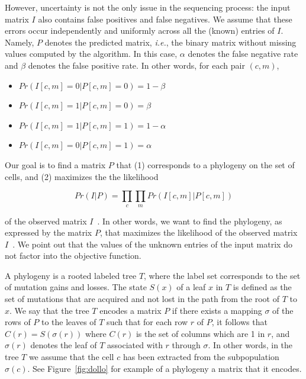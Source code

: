 \documentclass[a4paper,USenglish]{article}
\newcommand{\ie}{\emph{i.e.}}
\theoremstyle{definition}
\begin{document}
However, uncertainty is not the only issue in the sequencing process:
the input matrix $I$ also contains false positives and false
negatives.  We assume that these errors occur independently and
uniformly across all the (known) entries of $I$.  Namely, $P$ denotes
the predicted matrix, \ie, the binary matrix without missing values
computed by the algorithm.  In this case, $\alpha$ denotes the false
negative rate and $\beta$ denotes the false positive rate.  In other
words, for each pair $(c,m)$,
\begin{itemize}
\item $Pr(I[c,m] = 0|P[c,m] = 0) = 1- \beta$
\item $Pr(I[c,m] = 1|P[c,m] = 0) = \beta$
\item $Pr(I[c,m] = 1|P[c,m] = 1) = 1- \alpha$
\item $Pr(I[c,m] = 0|P[c,m] = 1) = \alpha$
\end{itemize}

Our goal is to find a matrix $P$ that (1) corresponds to a phylogeny
on the set of cells, and (2) maximizes the the likelihood

\begin{equation}
  \label{eq:likelihood}
  Pr(I|P) = \prod_{c} \prod_{m} Pr(I[c,m] | P[c,m])
\end{equation}

of the observed matrix $I$~\cite{Jahn2016}.  In other words, we want
to find the phylogeny, as expressed by the matrix $P$, that maximizes
the likelihood of the observed matrix $I$~\cite{Jahn2016}.  We point
out that the values of the unknown entries of the input matrix do not
factor into the objective function.

A phylogeny is a rooted labeled tree $T$, where the label set
corresponds to the set of mutation gains and losses.  The state $S(x)$
of a leaf $x$ in $T$ is defined as the set of mutations that are
acquired and not lost in the path from the root of $T$ to $x$.  We say
that the tree $T$ encodes a matrix $P$ if there exists a mapping
$\sigma$ of the rows of $P$ to the leaves of $T$ such that for each
row $r$ of $P$, it follows that $C(r)=S(\sigma(r))$ where $C(r)$ is
the set of columns which are 1 in $r$, and $\sigma(r)$ denotes the
leaf of $T$ associated with $r$ through $\sigma$.  In other words, in
the tree $T$ we assume that the cell $c$ has been extracted from the
subpopulation $\sigma(c)$.  See Figure~\ref{fig:dollo} for example of
a phylogeny a matrix that it encodes.
\end{document}
